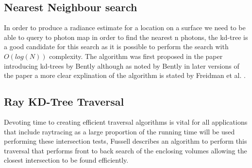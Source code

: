 \subsection{Nearest Neighbour search}
In order to produce a radiance estimate for a location on a surface we need to be able to query to
photon map in order to find the nearest n photons, the kd-tree is a good candidate for this search
as it is possible to perform the search with $O(log(N))$ complexity. The algorithm was first proposed in the
paper introducing kd-trees by Bently \cite{Bently75} although as noted by Bently in later versions of
the paper a more clear explination of the algorithm is stated by Freidman et al. \cite{Freidman77}.

\subsection{Ray KD-Tree Traversal}
Devoting time to creating efficient traversal algorithms is vital for all applications that
include raytracing as a large proportion of the running time will be used performing these
intersection tests, Fussell \cite{Fussell88} describes an algorithm to perform this traversal that
performs front to back search of the enclosing volumes allowing the closest intersection to be found
efficiently.
